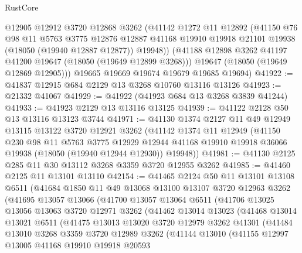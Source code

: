 \begin{lexlean}{RustCore}
\begin{coremodule}
        @12905
        @12912
        @3720
        @12868
        @3262
        (@41142
          @1272
          @11
          @12892
          (@41150
            @76
            @98
            @11
            @5763
            @3775
            @12876
            @12887
            @41168
            @19910
            @19918
            @21101
            @19938
            (@18050 (@19940 @12887 @12877))
            @19948))
        (@41188 @12898 @3262 @41197 @41200 @19647 (@18050 (@19649 @12899 @3268)))
        @19647
        (@18050 (@19649 @12869 @12905)))
      @19665
      @19669
      @19674
      @19679
      @19685
      @19694)
@41922 := @41837 @12915 @684 @2129 @13 @3268 @10760 @13116 @13126
@41923 := @21332 @41067
@41929 := @41922 (@41923 @684 @13 @3268 @3839 @41244)
@41933 := @41923 @2129 @13 @13116 @13125
@41939 := @41122 @2128 @50 @13 @13116 @13123 @3744
@41971 := @41130
    @1374
    @2127
    @11
    @49
    @12949
    @13115
    @13122
    @3720
    @12921
    @3262
    (@41142
      @1374
      @11
      @12949
      (@41150
        @230
        @98
        @11
        @5763
        @3775
        @12929
        @12944
        @41168
        @19910
        @19918
        @36066
        @19938
        (@18050 (@19940 @12944 @12930))
        @19948))
@41981 := @41130 @2125 @285 @11 @30 @13112 @3268 @3359 @3720 @12955 @3262
@41985 := @41460 @2125 @11 @13101 @13110
@42154 := @41465
    @2124
    @50
    @11
    @13101
    @13108
    @6511
    (@41684
      @1850
      @11
      @49
      @13068
      @13100
      @13107
      @3720
      @12963
      @3262
      (@41695
        @13057
        @13066
        (@41700
          @13057
          @13064
          @6511
          (@41706
            @13025
            @13056
            @13063
            @3720
            @12971
            @3262
            (@41462
              @13014
              @13023
              (@41468
                @13014
                @13021
                @6511
                (@41475
                  @13013
                  @13020
                  @3720
                  @12979
                  @3262
                  @41301
                  (@41484
                    @13010
                    @3268
                    @3359
                    @3720
                    @12989
                    @3262
                    (@41144
                      @13010
                      (@41155
                        @12997
                        @13005
                        @41168
                        @19910
                        @19918
                        @20593

\end{coremodule}
\end{lexlean}
